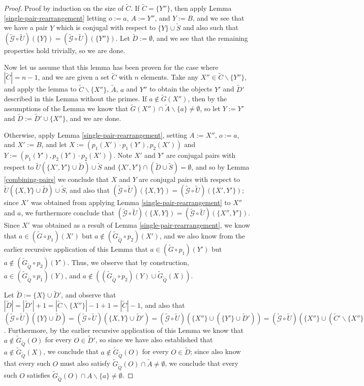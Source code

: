 \documentclass[12pt]{amsbook}
\theoremstyle{plain}
\theoremstyle{definition}
\theoremstyle{remark}
\newcommand{\set}{\tilde}
\newcommand{\genfun}{\tilde{\mathcal{G}}}
\newcommand{\paren}[1]{\left(#1\right)}
\begin{document}
\begin{proof}
Proof by induction on the size of $\set C$.  If $\set C=\{Y''\}$, then apply Lemma \ref{single-pair-rearrangement} letting $o:=a$, $A:=Y''$, and $Y:=B$, and we see that we have a pair $Y$ which is conjugal with respect to $\{Y\}\cup\set S$ and also such that $(\genfun\circ\set U)(\{Y\})=(\genfun\circ\set U)(\{Y''\})$.  Let $\set D:=\emptyset$, and we see that the remaining properties hold trivially, so we are done.

Now let us assume that this lemma has been proven for the case where $|\set C|=n-1$, and we are given a set $\set C$ with $n$ elements.  Take any $X''\in\set C\backslash\{Y''\}$, and apply the lemma to $\set C\backslash \{X''\}$, $\set A$, $a$ and $Y''$ to obtain the objects $Y'$ and $\set D'$ described in this Lemma without the primes.  If $a\notin\set G(X'')$, then by the assumptions of the Lemma we know that $\set G(X'') \cap \set A\backslash \{a\} \ne \emptyset$, so let $Y:=Y'$ and $\set D:=\set D'\cup\{X''\}$, and we are done.

Otherwise, apply Lemma \ref{single-pair-rearrangement}, setting $A:=X''$, $o:=a$, and $X':=B$, and let $X:=\paren{p_1(X')\cdot p_1(Y'),p_2(X')}$ and $Y:=\paren{p_1(Y'),p_2(Y')\cdot p_2(X')}$.  Note $X'$ and $Y'$ are conjugal pairs with respect to $\set U\paren{\{X',Y'\}\cup\set D}\cup\set S$ and $\{X',Y'\}\cap \paren{\set D\cup\set S}=\emptyset$, and so by Lemma \ref{combining-pairs} we conclude that $X$ and $Y$ are conjugal pairs with respect to $\set U\paren{\{X,Y\}\cup\set D}\cup\set S$, and also that $(\genfun\circ\set U)(\{X,Y\})=(\genfun\circ\set U)(\{X',Y'\})$;  since $X'$ was obtained from applying Lemma \ref{single-pair-rearrangement} to $X''$ and $a$, we furthermore conclude that $(\genfun\circ\set U)(\{X,Y\})=(\genfun\circ\set U)(\{X'',Y'\})$.  Since $X'$ was obtained as a result of Lemma \ref{single-pair-rearrangement}, we know that $a\in (\set G \circ p_1)(X')$ but $a\notin (\set G_{\set Q} \circ p_2)(X')$, and we also know from the earlier recursive application of this Lemma that $a\in (\set G \circ p_1)(Y')$ but $a\notin (\set G_{\set Q} \circ p_2)(Y')$.  Thus, we observe that by construction, $a\in (\set G_{\set Q} \circ p_1)(Y)$, and $a\notin \paren{(\set G_{\set Q} \circ p_2)(Y) \cup \set G_{\set Q}(X)}$.

Let $\set D:=\{X\}\cup\set D'$, and observe that $|\set D|=|\set D'|+1=|\set C\backslash \{X''\}|-1+1=|\set C|-1$, and also that $(\genfun\circ\set U)(\{Y\}\cup\set D)=(\genfun\circ\set U)(\{X,Y\}\cup\set D')=(\genfun\circ\set U)(\{X''\}\cup(\{Y'\}\cup\set D'))=(\genfun\circ\set U)(\{X''\}\cup(\set C'\backslash\{X''\}))=(\genfun\circ\set U)(\set C)$.  Furthermore, by the earlier recursive application of this Lemma we know that $a\notin\set G_{\set Q}(O)$ for every $O\in \set D'$, so since we have also established that $a\notin \set G_{\set Q}(X)$, we conclude that $a\notin\set G_{\set Q}(O)$ for every $O\in \set D$;  since also know that every such $O$ must also satisfy $\set G_{\set Q}(O)\cap \set A \ne \emptyset$, we conclude that every such $O$ satisfies $\set G_{\set Q}(O) \cap A\backslash\{a\}\ne\emptyset$.
\end{proof}
\end{document}
